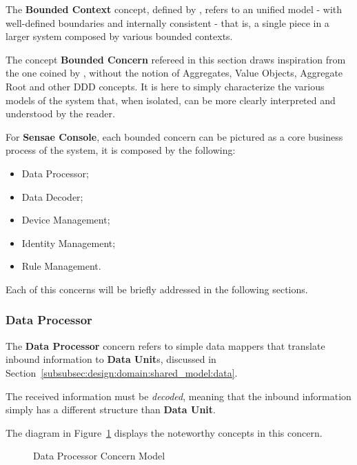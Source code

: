 The \textbf{Bounded Context} concept, defined by \cite{evans2014domain}, refers to an unified model - with well-defined boundaries and internally consistent - that is, a single piece in a larger system composed by various bounded contexts.

The concept \textbf{Bounded Concern} refereed in this section draws inspiration from the one coined by \cite{evans2014domain}, without the notion of Aggregates, Value Objects, Aggregate Root and other \gls{DDD} concepts. It is here to simply characterize the various models of the system that, when isolated, can be more clearly interpreted and understood by the reader.

For \textbf{Sensae Console}, each bounded concern can be pictured as a core business process of the system, it is composed by the following:

\begin{itemize}
   \item Data Processor;
   \item Data Decoder;
   \item Device Management;
   \item Identity Management;
   \item Rule Management.
\end{itemize}

Each of this concerns will be briefly addressed in the following sections.

\subsubsection{Data Processor}
\label{subsubsec:design:domain:bounded_contexts:processor}

The \textbf{Data Processor} concern refers to simple data mappers that translate inbound information to \textbf{Data Unit}s, discussed in Section~\ref{subsubsec:design:domain:shared_model:data}.

The received information must be \textit{decoded}, meaning that the inbound information simply has a different structure than \textbf{Data Unit}.

The diagram in Figure~\ref{fig:design:domain:bounded_contexts:processor:diagram} displays the noteworthy concepts in this concern.

\begin{figure}[H]
   \centering
  \resizebox{\columnwidth}{!}
  {
     
  }
  \caption[Data Processor Concern Model]{Data Processor Concern Model}
  \label{fig:design:domain:bounded_contexts:processor:diagram}
\end{figure}

